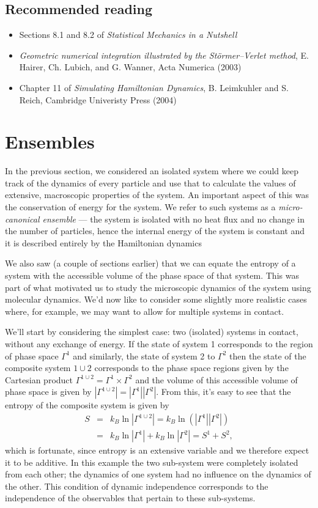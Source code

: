 \documentclass{article}
\begin{document}
\subsection*{Recommended reading}
\begin{itemize}
	\item Sections 8.1 and 8.2 of \emph{Statistical Mechanics in a Nutshell}
	\item \emph{Geometric numerical integration illustrated by the St\"{o}rmer–Verlet method}, E. Hairer, Ch. Lubich, and G. Wanner, Acta Numerica (2003)
	\item Chapter 11 of \emph{Simulating Hamiltonian Dynamics}, B. Leimkuhler and S. Reich, Cambridge Univeristy Press (2004)
\end{itemize}

\section*{Ensembles}

In the previous section, we considered an isolated system where we could keep track of the dynamics of every particle and use that to calculate the values of extensive, macroscopic properties of the system. An important aspect of this was the conservation of energy for the system. We refer to such systems as a \emph{micro-canonical ensemble} --- the system is isolated with no heat flux and no change in the number of particles, hence the internal energy of the system is constant and it is described entirely by the Hamiltonian dynamics

We also saw (a couple of sections earlier) that we can equate the entropy of a system with the accessible volume of the phase space of that system. This was part of what motivated us to study the microscopic dynamics of the system using molecular dynamics.  We'd now like to consider some slightly more realistic cases where, for example, we may want to allow for multiple systems in contact.

We'll start by considering the simplest case: two (isolated) systems in contact, without any exchange of energy. If the state of system 1 corresponds to the region of phase space $\Gamma^1$ and similarly, the state of system 2 to $\Gamma^2$ then the state of the composite system $1\cup 2$ corresponds to the phase space regions given by the Cartesian product $\Gamma^{1\cup 2}=\Gamma^1\times\Gamma^2$ and the volume of this accessible volume of phase space is given by $|\Gamma^{1\cup 2}|=|\Gamma^1||\Gamma^2|$. From this, it's easy to see that the entropy of the composite system is given by
\begin{eqnarray*}
	S &=& k_B\ln|\Gamma^{1\cup 2}| = k_B\ln(|\Gamma^1||\Gamma^2|)\\
		&=& k_B\ln|\Gamma^1| + k_B\ln|\Gamma^2| = S^1 + S^2,
\end{eqnarray*}
which is fortunate, since entropy is an extensive variable and we therefore expect it to be additive.
In this example the two sub-system were completely isolated from each other; the dynamics of one system had no influence on the dynamics of the other. This condition of dynamic independence corresponds to the independence of the observables that pertain to these sub-systems.
\end{document}
